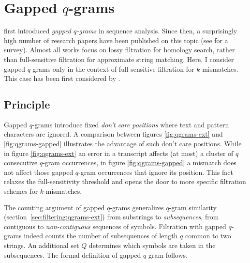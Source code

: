 
\section{Gapped $q$-grams}
\label{sec:filtering:qgrams-gapped}

\cite{Califano1993} first introduced \emph{gapped $q$-grams} in sequence analysis.
Since then, a surprisingly high number of research papers have been published on this topic (see \citep{Brown2008} for a survey).
Almost all works focus on lossy filtration for homology search, rather than full-sensitive filtration for approximate string matching.
Here, I consider gapped $q$-grams only in the context of full-sensitive filtration for $k$-mismatches.
This case has been first considered by \cite{Burkhardt2001}.

\subsection{Principle}

Gapped $q$-grams introduce fixed \emph{don't care positions} where text and pattern characters are ignored.
A comparison between figures \ref{fig:qgrams-ext} and \ref{fig:qgrams-gapped} illustrates the advantage of such don't care positions.
While in figure \ref{fig:qgrams-ext} an error in a transcript affects (at most) a cluster of $q$ consecutive $q$-gram occurrences, in figure \ref{fig:qgrams-gapped} a mismatch does not affect those gapped $q$-gram occurrences that ignore its position.
This fact relaxes the full-sensitivity threshold and opens the door to more specific filtration schemes for $k$-mismatches.

The counting argument of gapped $q$-grams generalizes $q$-gram similarity (section~\ref{sec:filtering:qgrams-ext}) from substrings to \emph{subsequences}, \ie from contiguous to \emph{non-contiguous} sequences of symbols.
Filtration with gapped $q$-grams indeed counts the number of subsequences of length $q$ common to two strings.
An additional set $Q$ determines which symbols are taken in the subsequences.
The formal definition of gapped $q$-gram follows.

